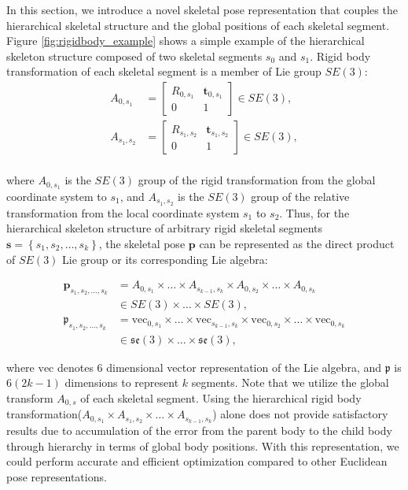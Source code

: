 In this section, we introduce a novel skeletal pose representation that couples the hierarchical skeletal structure and the global positions of each skeletal segment. Figure \ref{fig:rigidbody_example} shows a simple example of the hierarchical skeleton structure composed of two skeletal segments $s_0$ and $s_1$. Rigid body transformation of each skeletal segment is a member of Lie group $SE(3)$:
\begin{equation}
	\begin{split}
		A_{0,s_1} & =
		\begin{bmatrix}
			R_{0,s_1} & \mathbf{t}_{0,s_1}\\ 
			0&1
		\end{bmatrix} \in SE(3),\\  
		A_{s_1,s_2} & =
		\begin{bmatrix}
			R_{s_1,s_2} & \mathbf{t}_{s_1,s_2}\\ 
			0&1  
		\end{bmatrix} \in SE(3),\\
	\end{split}
\end{equation}

where $A_{0,s_1}$ is the $SE(3)$ group of the rigid transformation from the global coordinate system to $s_1$, and $A_{s_1,s_2}$ is the $SE(3)$ group of the relative transformation from the local coordinate system $s_1$ to $s_2$. Thus, for the hierarchical skeleton structure of arbitrary rigid skeletal segments $\mathbf{s} = \left \{ s_1, s_2, \dots, s_k\right \}$, the skeletal pose $\mathbf{p}$ can be represented as the direct product of $SE(3)$ Lie group or its corresponding Lie algebra:

\begin{equation}
\begin{split}
	\mathbf{p}_{ s_1, s_2, \ldots, s_k} &= A_{0,s_1} \times \ldots \times A_{s_{k-1},s_k} \times A_{0,s_2} \times \ldots \times A_{0,s_k}\\
	&\in SE(3) \times \ldots \times SE(3),\\
	\mathfrak{p}_{ s_1, s_2, \ldots, s_k} &= \mathrm{vec}_{0, s_1} \times \ldots \times \mathrm{vec}_{s_{k-1},s_k} \times \mathrm{vec}_{0, s_2} \times \ldots \times \mathrm{vec}_{0,s_k}\\
	&\in \mathfrak{se}(3) \times \ldots \times \mathfrak{se}(3),
\end{split}
\end{equation}

where $\mathrm{vec}$ denotes 6 dimensional vector representation of the Lie algebra, and $\mathfrak{p}$ is $6(2k-1)$ dimensions to represent $k$ segments.
Note that we utilize the global transform $A_{0,s}$ of each skeletal segment. Using the hierarchical rigid body transformation($A_{0,s_1} \times A_{s_1,s_2} \times \ldots \times A_{s_{k-1},s_k}$) alone does not provide satisfactory results due to accumulation of the error from the parent body to the child body through hierarchy in terms of global body positions.
With this representation, we could perform accurate and efficient optimization compared to other Euclidean pose representations.

